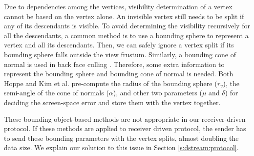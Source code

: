     Due to dependencies among the vertices, visibility determination of a vertex cannot be based 
	on the vertex alone.
    An invisible vertex still needs to be split if any of its descendants is visible. 
    To avoid determining the visibility %
    recursively for all the descendants,
    a common method is to use a bounding sphere to represent a vertex and all its descendants.
    Then, we can safely ignore a vertex split if its bounding sphere
    falls outside the view frustum.
    Similarly, a bounding cone of normal is used in back face culling \cite{258843}.
    Therefore, some extra information to represent the bounding sphere
    and bounding cone of normal is needed. Both Hoppe and Kim et al. \cite{258843, kim:view}
    pre-compute the radius of the bounding sphere ($r_v$), the semi-angle of
    the cone of normals ($\alpha$), and other two parameters
    ($\mu$ and $\delta$) for deciding the screen-space error
    and store them with the vertex together.
    
    These bounding object-based methods are not appropriate
    in our receiver-driven protocol. 
    If these methods are applied to receiver driven protocol, the sender has to send
    these bounding parameters with the vertex splits, almost doubling 
    the data size.  We explain our solution to this issue in Section \ref{s:dstream:protocol}.

